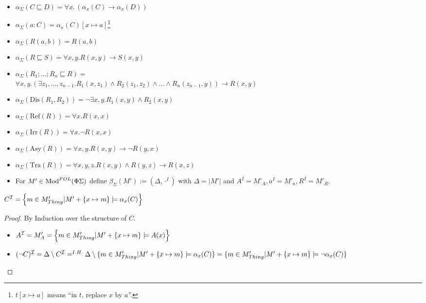 \documentclass[10pt, a4paper]{isov2}
\begin{document}
\begin{itemize}
 \item $\alpha_\Sigma (C \sqsubseteq D) = \forall x.\, (\alpha_x(C) \rightarrow \alpha_x(D))$
 \item $\alpha_\Sigma (a:C) = \alpha_x(C)[x\mapsto a]$\footnote{$t[x\mapsto a]$ means ``in $t$, replace $x$ by $a$''.}
 \item $\alpha_\Sigma (R(a,b)) = R(a,b)$
 \item $\alpha_\Sigma (R \sqsubseteq S) = \forall x, y. R(x,y) \rightarrow S(x,y) $
 \item $\alpha_\Sigma (R_1; \ldots; R_n \sqsubseteq R) =$\\
$ \forall x,y . (\exists z_1,\ldots, z_{n-1} . R_1(x,z_1) \wedge R_2(z_1,z_2) \wedge \ldots \wedge R_n(z_{n-1},y)) \rightarrow R(x,y) $
 \item $\alpha_\Sigma (\text{Dis}(R_1,R_2)) = \neg\exists x,y . R_1(x,y)\wedge R_2(x,y)$	
 \item $\alpha_\Sigma (\text{Ref}(R)) = \forall x. R(x,x)$
 \item $\alpha_\Sigma (\text{Irr}(R)) = \forall x. \neg R(x,x)$
 \item $\alpha_\Sigma (\text{Asy}(R)) = \forall x,y . R(x,y) \rightarrow \neg R(y,x)$
 \item $\alpha_\Sigma (\text{Tra}(R)) = \forall x,y,z . R(x,y) \wedge R(y,z) \rightarrow R(x,z)$
\end{itemize}



\begin{itemize}
	\item For $M' \in \text{Mod}^{FOL}(\Phi \Sigma)$ define $\beta_\Sigma(M') := (\Delta, \cdot^I)$
	with $\Delta = |M'|$ and $A^I = M'_A, a^I = M'_a, R^I = M'_R$.
\end{itemize}

	\begin{proposition}
$C^{\mathcal{I}} = \left\{m \in M'_{{Thing} } \lvert M' + \{x \mapsto m \} \models \alpha_x (C) \right\}$
	\end{proposition}
	
	\begin{proof} By Induction over the structure of $C$.
\begin{itemize}
	\item $A^{\mathcal{I}} = M'_A = \left \{m \in M'_{{Thing} } \vert M' + \{x \mapsto m \} \models A(x)  \right\}$
	\item $(\lnot C)^{\mathcal{I}} = \Delta \setminus C^{\mathcal{I}} =^{I.H.} \Delta \setminus \{m \in M'_{Thing}  \lvert M' + \{x \mapsto m\} \models \alpha_x(C)\} = \{m \in M'_{Thing}  \vert M' + \{x \mapsto m\} \models \lnot \alpha_x(C)\}$
\end{itemize}
	\end{proof}
\end{document}
